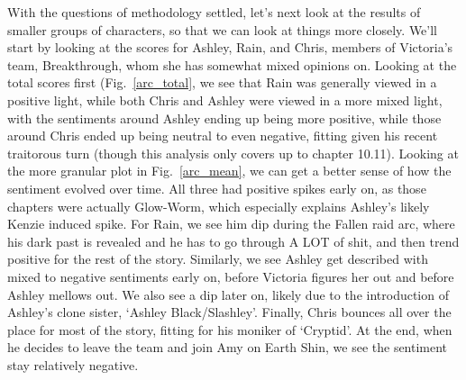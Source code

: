 \documentclass[11pt]{article}
\begin{document}
\noindent
With the questions of methodology settled, let's next look at the results of smaller groups of characters, so that we can look at things more closely. We'll start by looking at the scores for Ashley, Rain, and Chris, members of Victoria's team, Breakthrough, whom she has somewhat mixed opinions on. Looking at the total scores first (Fig.~\ref{arc_total}, we see that Rain was generally viewed in a positive light, while both Chris and Ashley were viewed in a more mixed light, with the sentiments around Ashley ending up being more positive, while those around Chris ended up being neutral to even negative, fitting given his recent traitorous turn (though this analysis only covers up to chapter 10.11). Looking at the more granular plot in Fig.~\ref{arc_mean}, we can get a better sense of how the sentiment evolved over time. All three had positive spikes early on, as those chapters were actually Glow-Worm, which especially explains Ashley's likely Kenzie induced spike. For Rain, we see him dip during the Fallen raid arc, where his dark past is revealed and he has to go through A LOT of shit, and then trend positive for the rest of the story. Similarly, we see Ashley get described with mixed to negative sentiments early on, before Victoria figures her out and before Ashley mellows out. We also see a dip later on, likely due to the introduction of Ashley's clone sister, `Ashley Black/Slashley'. Finally, Chris bounces all over the place for most of the story, fitting for his moniker of `Cryptid'. At the end, when he decides to leave the team and join Amy on Earth Shin, we see the sentiment stay relatively negative. 
\end{document}
